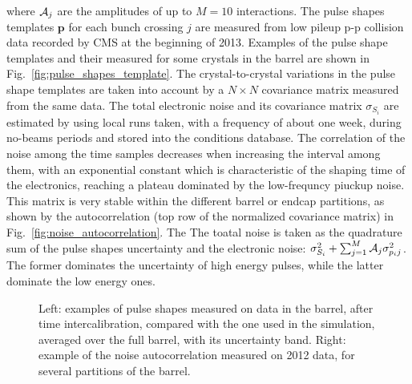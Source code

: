 \documentclass[journal]{IEEEtran}
\begin{document}
where ${\cal A}_{j}$ are the amplitudes of up to $M=10$ interactions. The pulse shapes templates $\mathbf p$ for each bunch crossing $j$ are measured from low pileup p-p collision data recorded by CMS at the beginning of 2013. Examples of the pulse shape templates and their measured for some crystals in the barrel are shown in Fig.~\ref{fig:pulse_shapes_template}. The crystal-to-crystal variations in the pulse shape templates are taken into account by a $N \times N$ covariance matrix measured from the same data. The total electronic noise and its covariance matrix $\sigma_{S_i}$ are estimated by using local runs taken, with a frequency of about one week, during no-beams periods and stored into the conditions database. The correlation of the noise among the time samples decreases when increasing the interval among them, with an exponential constant which is characteristic of the shaping time of the electronics, reaching a plateau dominated by the low-frequncy piuckup noise. This matrix is very stable within the different barrel or endcap partitions, as shown by the autocorrelation (top row of the normalized covariance matrix) in Fig.~\ref{fig:noise_autocorrelation}. The  The toatal noise is taken as the quadrature sum of the pulse shapes uncertainty and the electronic noise: $\sigma_{S_i}^2+\sum_{j=1}^M {\cal A}_{j}\sigma_{p_ij}^2$. The former dominates the uncertainty of high energy pulses, while the latter dominate the low energy ones.
%
\begin{figure}[!t]
  \begin{center}
    \caption{Left: examples of pulse shapes measured on data in the barrel, after time intercalibration, compared with the one used in the simulation, averaged over the full barrel, with its uncertainty band. Right: example of the noise autocorrelation measured on 2012 data, for several partitions of the barrel. \label{fig:pulse_shapes} }
  \end{center}
\end{figure}
\end{document}
